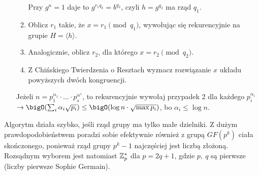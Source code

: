 \begin{greyframe}
\begin{enumerate}
\begin{enumerate}
\[            \]
            Przy \( g^n = 1 \) daje to \( g^{r_1 q_2} = b^{q_2} \), czyli \( h = g^{q_2} \) ma rząd \( q_1 \).
            \item Oblicz \( r_1 \) takie, że \( x = r_1 \pmod{q_1} \), wywołując się rekurencyjnie na grupie \( H = \langle h \rangle \).
            \item Analogicznie, oblicz \( r_2 \), dla którego \( x = r_2 \pmod{q_2} \).
            \item Z Chińskiego Twierdzenia o Resztach wyznacz rozwiązanie \( x \) układu powyższych dwóch kongruencji.
        \end{enumerate}
        Jeżeli \( n = p_1^{\alpha_1} \cdot \ldots \cdot p_s^{\alpha^s} \), to rekurencyjnie wywołaj przypadek 2 dla każdego \( p_i^{\alpha_i} \) \( \rightarrow \bigO(\sum_i \alpha_i \sqrt{p_i}) \leq \bigO(\log n \cdot \sqrt{\max{p_i}}) \), bo \( \alpha_i \leq \log n \).
    \end{enumerate}
\end{greyframe}

Algorytm działa szybko, jeśli rząd grupy ma tylko małe dzielniki. Z dużym prawdopodobieństwem poradzi sobie efektywnie również z grupą \( GF(p^k) \) ciała skończonego, ponieważ rząd grupy \( p^k - 1 \) najczęściej jest liczbą złożoną.
Rozsądnym wyborem jest natomiast \( \mathbb{Z}^{*}_p \) dla \( p = 2q + 1 \), gdzie \( p, \ q \) są pierwsze (liczby pierwsze Sophie Germain).
